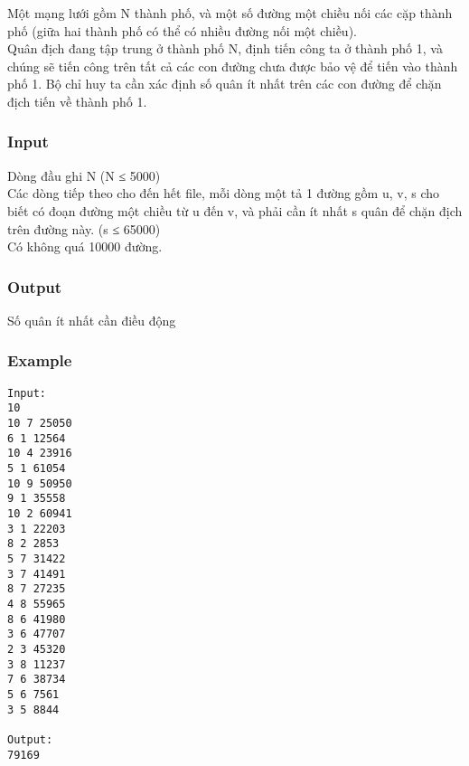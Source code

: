 



   Một mạng lưới gồm N thành phố, và một số đường một chiều nối các cặp thành phố (giữa hai thành phố có thể có nhiều đường nối một chiều).   
\\   Quân địch đang tập trung ở thành phố N, định tiến công ta ở thành phố 1, và chúng sẽ tiến công trên tất cả các con đường chưa được bảo vệ để tiến vào thành phố 1. Bộ chỉ huy ta cần xác định số quân ít nhất trên các con đường để chặn địch tiến về thành phố 1.  

\subsubsection{   Input  }

   Dòng đầu ghi N (N ≤ 5000)   
\\   Các dòng tiếp theo cho đến hết file, mỗi dòng một tả 1 đường gồm u, v, s cho biết có đoạn đường một chiều từ u đến v, và phải cần ít nhất s quân để chặn địch trên đường này. (s ≤ 65000)   
\\   Có không quá 10000 đường.  

\subsubsection{   Output  }

   Số quân ít nhất cần điều động  

\subsubsection{   Example  }
\begin{verbatim}
Input:
10
10 7 25050
6 1 12564
10 4 23916
5 1 61054
10 9 50950
9 1 35558
10 2 60941
3 1 22203
8 2 2853
5 7 31422
3 7 41491
8 7 27235
4 8 55965
8 6 41980
3 6 47707
2 3 45320
3 8 11237
7 6 38734
5 6 7561
3 5 8844

Output:
79169

\end{verbatim}